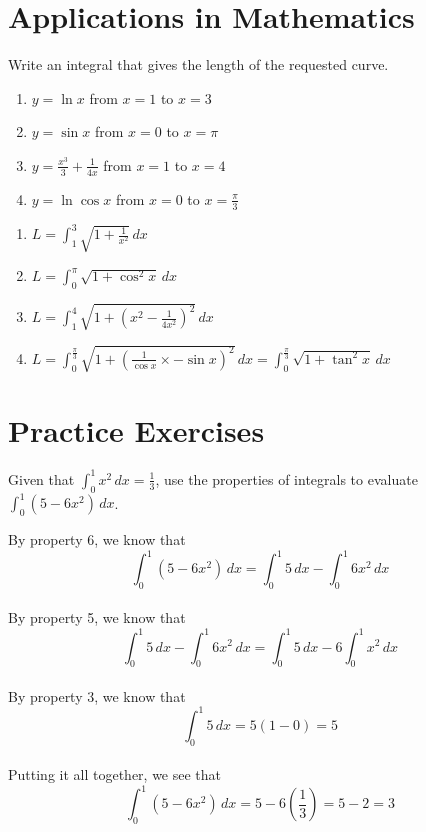 \section{Applications in Mathematics}

\begin{Exercise}[label=length1]
Write an integral that gives the length of the requested curve.
	\begin{enumerate}
	\item $y = \ln{x}$ from $x = 1$ to $x = 3$
	\item $y = \sin{x}$ from $x = 0$ to $x = \pi$
	\item $y = \frac{x^3}{3} + \frac{1}{4x}$ from $x = 1$ to $x = 4$
	\item $y = \ln{\cos{x}}$ from $x = 0$ to $x = \frac{\pi}{3}$
	\end{enumerate}	 
\end{Exercise}

\begin{Answer}[ref=length1]
	\begin{enumerate}
	\item $L = \int_{1}^{3} \sqrt{1 + \frac{1}{x^2}}\,dx$
	\item $L = \int_{0}^{\pi} \sqrt{1 + \cos^2{x}}\,dx$
	\item $L = \int_{1}^{4} \sqrt{1 + (x^2-\frac{1}{4x^2})^2}\,dx$
	\item $L = \int_{0}^{\frac{\pi}{3}} \sqrt{1 + (\frac{1}{\cos{x}} 
	\times - \sin{x})^2}\,dx = \int_{0}^{\frac{\pi}{3}} \sqrt{1 + 
	\tan^2{x}}\,dx$
	\end{enumerate}
\end{Answer}


\section{Practice Exercises}
\begin{Exercise}[label=defint2]
Given that $\int_{0}^{1} x^2\,dx = \frac{1}{3}$, use the properties 
of integrals to evaluate $\int_{0}^{1} (5-6x^2)\,dx$. 
\end{Exercise}

\begin{Answer}[ref=defint2]
By property 6, we know that $$\int_{0}^{1} (5-6x^2)\,dx = \int_{0}^{1} 
5\,dx - \int_{0}^{1} 6x^2\,dx$$\\
By property 5, we know that $$\int_{0}^{1} 5\,dx - \int_{0}^{1} 6x^2\,
dx = \int_{0}^{1} 5\,dx - 6\int_{0}^{1} x^2\,dx$$\\
By property 3, we know that $$\int_{0}^{1} 5\,dx = 5(1 - 0) = 5$$\\
Putting it all together, we see that $$\int_{0}^{1} (5-6x^2)\,dx = 5 
- 6(\frac{1}{3}) = 5 - 2 = 3$$
\end{Answer}

